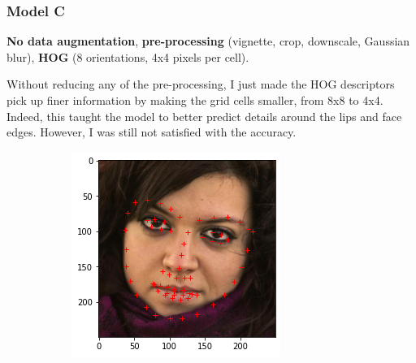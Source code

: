 \documentclass{article}
\begin{document}
\subsubsection{Model C}
\textbf{No data augmentation}, \textbf{pre-processing} (vignette, crop, downscale, Gaussian blur), \textbf{HOG} (8 orientations, 4x4 pixels per cell).

Without reducing any of the pre-processing, I just made the HOG descriptors pick up finer information by making the grid cells smaller, from 8x8 to 4x4. Indeed, this taught the model to better predict details around the lips and face edges. However, I was still not satisfied with the accuracy.

\begin{figure}[h]
  \centering
  \begin{subfigure}[b]{0.35\textwidth}
    \includegraphics[width=\textwidth]{C1}
  \end{subfigure}
  \begin{subfigure}[b]{.35\textwidth}

\end{subfigure}
\end{figure}
\end{document}
